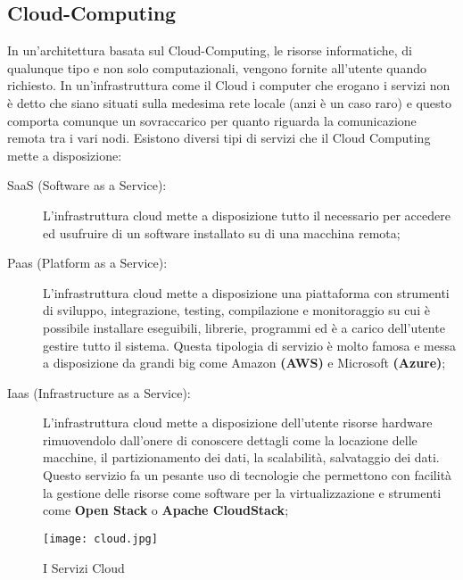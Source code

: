 \subsection{Cloud-Computing}
In un'architettura basata sul Cloud-Computing, le risorse informatiche, di qualunque tipo e non solo computazionali, vengono fornite all'utente quando richiesto. In un'infrastruttura come il Cloud i computer che erogano i servizi non è detto che siano situati sulla medesima rete locale (anzi è un caso raro) e questo comporta comunque un sovraccarico per quanto riguarda la comunicazione remota tra i vari nodi. Esistono diversi tipi di servizi che il Cloud Computing mette a disposizione:
\begin{description}
     \item[SaaS (Software as a Service):] L'infrastruttura cloud mette a disposizione tutto il necessario per accedere ed usufruire di un software installato su di una macchina remota;
     \item[Paas (Platform as a Service):] L'infrastruttura cloud mette a disposizione una piattaforma con strumenti di sviluppo, integrazione, testing, compilazione e monitoraggio su cui è possibile installare eseguibili, librerie, programmi ed è a carico dell'utente gestire tutto il sistema. Questa tipologia di servizio è molto famosa e messa a disposizione da grandi big come Amazon \textbf{(AWS)} e Microsoft \textbf{(Azure)};
     \item[Iaas (Infrastructure as a Service):] L'infrastruttura cloud mette a disposizione dell'utente risorse hardware rimuovendolo dall'onere di conoscere dettagli come la locazione delle macchine, il partizionamento dei dati, la scalabilità, salvataggio dei dati. Questo servizio fa un pesante uso di tecnologie che permettono con facilità la gestione delle risorse come software per la virtualizzazione e strumenti come \textbf{Open Stack} o \textbf{Apache CloudStack};
   \end{description}   
\begin{figure}[H]
  \begin{center}
    \texttt{[image: cloud.jpg]}
    \caption{I Servizi Cloud}
    \label{fg:cloud.jpg}
  \end{center}
\end{figure}
